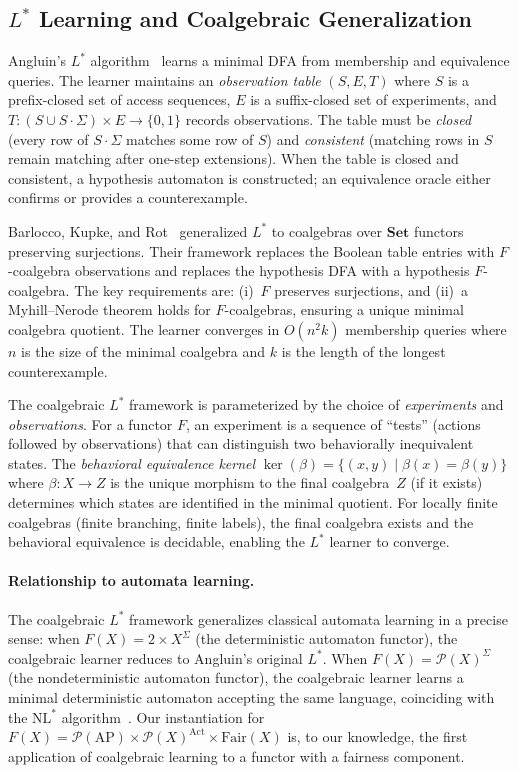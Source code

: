 \documentclass[11pt]{article}
\newcommand{\Set}{\mathbf{Set}}
\newcommand{\Pow}{\mathcal{P}}
\newcommand{\Fair}{\ensuremath{\mathrm{Fair}}}
\newcommand{\Act}{\ensuremath{\mathrm{Act}}}
\newcommand{\AP}{\ensuremath{\mathrm{AP}}}
\begin{document}
\subsection{$L^*$ Learning and Coalgebraic Generalization}

Angluin's $L^*$ algorithm~\cite{Angluin87} learns a minimal DFA from
membership and equivalence queries.
The learner maintains an \emph{observation table} $(S, E, T)$ where $S$ is a
prefix-closed set of access sequences, $E$ is a suffix-closed set of
experiments, and $T : (S \cup S \cdot \Sigma) \times E \to \{0,1\}$
records observations.
The table must be \emph{closed} (every row of $S \cdot \Sigma$ matches some
row of $S$) and \emph{consistent} (matching rows in $S$ remain matching after
one-step extensions).
When the table is closed and consistent, a hypothesis automaton is
constructed; an equivalence oracle either confirms or provides a
counterexample.

Barlocco, Kupke, and Rot~\cite{BarloccoKR19} generalized $L^*$ to coalgebras
over $\Set$ functors preserving surjections.
Their framework replaces the Boolean table entries with $F$-coalgebra
observations and replaces the hypothesis DFA with a hypothesis $F$-coalgebra.
The key requirements are: (i)~$F$ preserves surjections, and (ii)~a
Myhill--Nerode theorem holds for $F$-coalgebras, ensuring a unique minimal
coalgebra quotient.
The learner converges in $O(n^2 k)$ membership queries where $n$ is the
size of the minimal coalgebra and $k$ is the length of the longest
counterexample.

The coalgebraic $L^*$ framework is parameterized by the choice of
\emph{experiments} and \emph{observations}.
For a functor $F$, an experiment is a sequence of ``tests'' (actions
followed by observations) that can distinguish two behaviorally
inequivalent states.
The \emph{behavioral equivalence kernel}
$\ker(\beta) = \{(x, y) \mid \beta(x) = \beta(y)\}$
where $\beta : X \to Z$ is the unique morphism to the final coalgebra~$Z$
(if it exists) determines which states are identified in the minimal
quotient.
For locally finite coalgebras (finite branching, finite labels), the final
coalgebra exists and the behavioral equivalence is decidable, enabling
the $L^*$ learner to converge.

\paragraph{Relationship to automata learning.}
The coalgebraic $L^*$ framework generalizes classical automata learning
in a precise sense: when $F(X) = 2 \times X^\Sigma$ (the deterministic
automaton functor), the coalgebraic learner reduces to Angluin's original
$L^*$.
When $F(X) = \Pow(X)^\Sigma$ (the nondeterministic automaton functor),
the coalgebraic learner learns a minimal deterministic automaton accepting
the same language, coinciding with the $\mathrm{NL}^*$
algorithm~\cite{BarloccoKR19}.
Our instantiation for
$F(X) = \Pow(\AP) \times \Pow(X)^{\Act} \times \Fair(X)$
is, to our knowledge, the first application of coalgebraic learning to
a functor with a fairness component.
\end{document}
